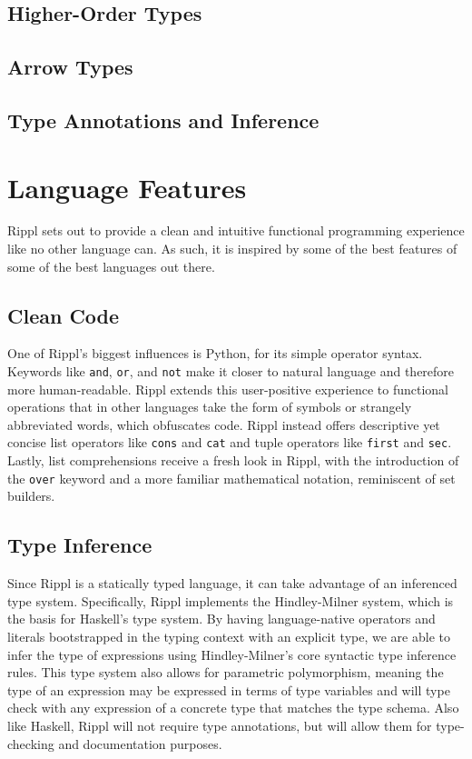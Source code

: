 ﻿\documentclass[5pt]{article}
\begin{document}
\subsection{Higher-Order Types}

\subsection{Arrow Types}

\subsection{Type Annotations and Inference}

\section{Language Features}
Rippl sets out to provide a clean and intuitive functional programming experience like no other language can. As such, it is inspired by some of the best features of some of the best languages out there.
\subsection{Clean Code}
One of Rippl’s biggest influences is Python, for its simple operator syntax.
Keywords like \texttt{and}, \texttt{or}, and \texttt{not} make it closer to
natural language and therefore more human-readable. Rippl extends this
user-positive experience to functional operations that in other languages take
the form of symbols or strangely abbreviated words, which obfuscates code. Rippl instead offers descriptive yet concise list operators like \texttt{cons} and
\texttt{cat} and tuple operators like \texttt{first} and \texttt{sec}. Lastly,
list comprehensions receive a fresh look in Rippl, with the introduction of the
\texttt{over} keyword and a more familiar mathematical notation, reminiscent of set builders.
\subsection{Type Inference}
Since Rippl is a statically typed language, it can take advantage of an inferenced type system. Specifically, Rippl implements the Hindley-Milner system, which is the basis for Haskell’s type system. By having language-native operators and literals bootstrapped in the typing context with an explicit type, we are able to infer the type of expressions using Hindley-Milner's core syntactic type inference rules. This type system also allows for parametric polymorphism, meaning the type of an expression may be expressed in terms of type variables and will type check with any expression of a concrete type that matches the type schema. Also like Haskell, Rippl will not require type annotations, but will allow them for type-checking and documentation purposes.
\end{document}
